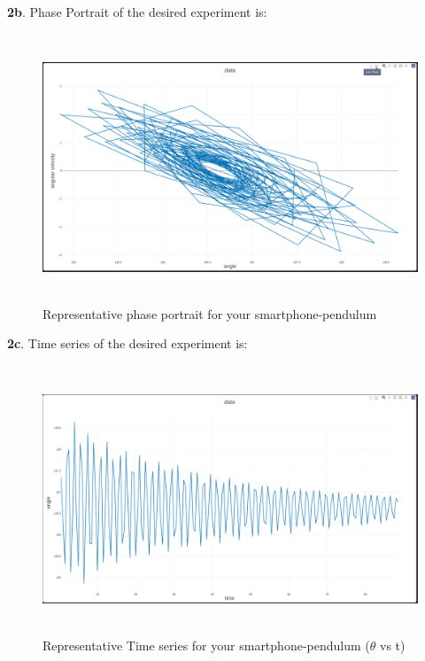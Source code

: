 \documentclass[11pt]{scrartcl} %
\begin{document}
\newpage
\textbf{2b}.
Phase Portrait of the desired experiment is:
\begin{figure}[h] %
	\centering
	\includegraphics[width=12cm, height=8cm]{Anshul_2b.PNG} %
	\caption {Representative phase portrait for your smartphone-pendulum}
\end{figure}

\textbf{2c}.
Time series of the desired experiment is:
\begin{figure}[h] %
	\centering
	\includegraphics[width=12cm, height=8cm]{Anshul_2c.PNG} %
	\caption {Representative Time series for your smartphone-pendulum ($\theta$ vs t)}
\end{figure}
\end{document}

